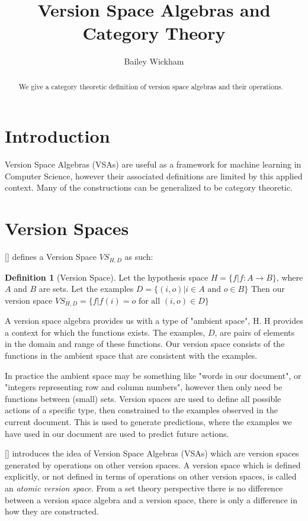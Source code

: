 \documentclass{article}
\title{Version Space Algebras and Category Theory}
\author{Bailey Wickham}
\theoremstyle{definition}
\newtheorem{definition}{Definition}[section]
\begin{document}
\maketitle

\begin{abstract}
We give a category theoretic definition of version space algebras and their operations. 
\end{abstract}

\section{Introduction}
Version Space Algebras (VSAs) are useful as a framework for machine learning in Computer Science, however their associated definitions are limited by this applied context. Many of the constructions can be generalized to be category theoretic. 

\section{Version Spaces}
[] defines a Version Space $VS_{H,D}$ as such: 
\begin{definition}[Version Space] 
    Let the hypothesis space $H = \{f | f: A \rightarrow B \}$, where $A$ and $B$ are sets. Let the examples $D = \{(i, o) | i \in A \text{ and } o \in B\}$ Then our version space $VS_{H,D}= \{f | f(i) = o \text{ for all } (i,o) \in D\}$
\end{definition}

A version space algebra provides us with a type of "ambient space", H. H provides a context for which the functions exists. The examples, $D$, are pairs of elements in the domain and range of these functions. Our version space consists of the functions in the ambient space that are consistent with the examples. 

In practice the ambient space may be something like "words in our document", or "integers representing row and column numbers", however then only need be functions between (small) sets. Version spaces are used to define all possible actions of a specific type, then constrained to the examples observed in the current document. This is used to generate predictions, where the examples we have used in our document are used to predict future actions.

[] introduces the idea of Version Space Algebras (VSAs) which are version spaces generated by operations on other version spaces. A version space which is defined explicitly, or not defined in terms of operations on other version spaces, is called an \textit{atomic version space}. From a set theory perspective there is no difference between a version space algebra and a version space, there is only a difference in how they are constructed. 
\end{document}
